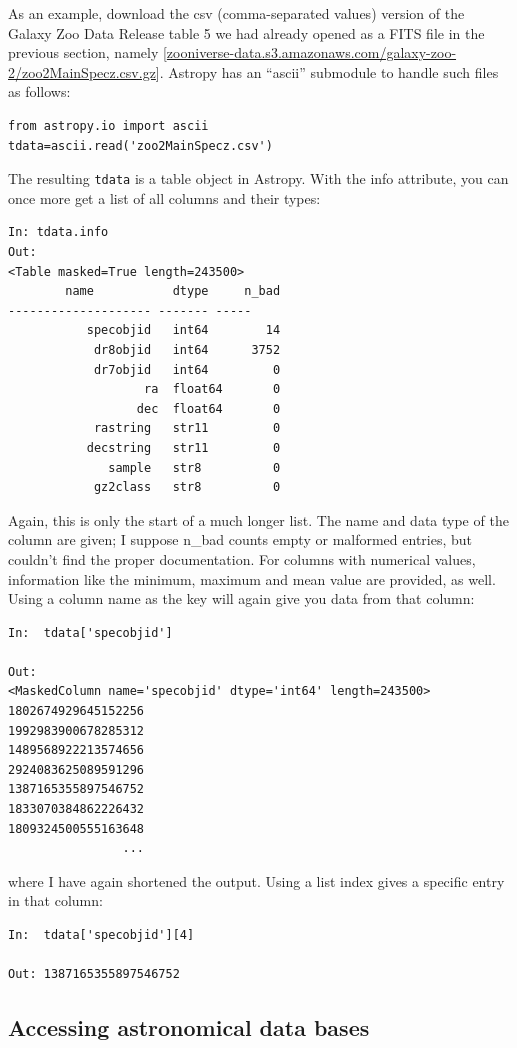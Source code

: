 \documentclass[twocolumn,apj]{openjournal}
\begin{document}
As an example, download the csv (comma-separated values) version of the Galaxy Zoo Data Release table 5 we had already opened as a FITS file in the previous section, namely [\href{zooniverse-data.s3.amazonaws.com/galaxy-zoo-2/zoo2MainSpecz.csv.gz}{zooniverse-data.s3.amazonaws.com/galaxy-zoo-2/zoo2MainSpecz.csv.gz}].  Astropy has an ``ascii'' submodule to handle such files as follows:
\begin{lstlisting}
from astropy.io import ascii
tdata=ascii.read('zoo2MainSpecz.csv')
\end{lstlisting}
The resulting \verb|tdata| is a table object in Astropy. With the info attribute, you can once more get a list of all columns and their types:
\begin{lstlisting}
In: tdata.info
Out: 
<Table masked=True length=243500>
        name           dtype     n_bad
-------------------- ------- -----
           specobjid   int64        14
            dr8objid   int64      3752
            dr7objid   int64         0
                   ra  float64       0
                  dec  float64       0
            rastring   str11         0
           decstring   str11         0
              sample   str8          0
            gz2class   str8          0
\end{lstlisting}       
Again, this is only the start of a much longer list. The name and data type of the column are given; I suppose n\_bad counts empty or malformed entries, but couldn't find the proper documentation. For columns with numerical values, information like the minimum, maximum and mean value are provided, as well. Using a column name as the key will again give you data from that column:
\begin{lstlisting}
In:  tdata['specobjid']

Out: 
<MaskedColumn name='specobjid' dtype='int64' length=243500>
1802674929645152256
1992983900678285312
1489568922213574656
2924083625089591296
1387165355897546752
1833070384862226432
1809324500555163648
                ...
\end{lstlisting}                                          
where I have again shortened the output. Using a list index gives a specific entry in that column:
\begin{lstlisting}
In:  tdata['specobjid'][4]

Out: 1387165355897546752
\end{lstlisting}  

\subsection{Accessing astronomical data bases}
\label{PYVO}
\end{document}
